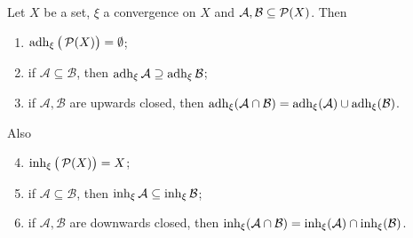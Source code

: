 \begin{proposition}
Let $X$ be a set, $\xi$ a convergence on $X$ and $\mathcal{A},\mathcal{B} \subseteq \operatorname{\mathcal{P}}(X)$. Then
\begin{enumerate}
\item $\operatorname{adh}_\xi \big(\operatorname{\mathcal{P}}(X)\big) = \emptyset$;
\item if $\mathcal{A} \subseteq \mathcal{B}$, then $\operatorname{adh}_\xi \mathcal{A} \supseteq \operatorname{adh}_\xi \mathcal{B}$;
\item if $\mathcal{A},\mathcal{B}$ are upwards closed, then $\operatorname{adh}_\xi(\mathcal{A}\cap \mathcal{B}) = \operatorname{adh}_\xi(\mathcal{A}) \cup \operatorname{adh}_\xi(\mathcal{B})$.
\end{enumerate}
Also
\begin{enumerate} \setcounter{enumi}{3}
\item $\operatorname{inh}_\xi\big(\operatorname{\mathcal{P}}(X)\big) = X$;
\item if $\mathcal{A} \subseteq \mathcal{B}$, then $\operatorname{inh}_\xi \mathcal{A} \subseteq \operatorname{inh}_\xi \mathcal{B}$;
\item if $\mathcal{A},\mathcal{B}$ are downwards closed, then $\operatorname{inh}_\xi(\mathcal{A}\cap \mathcal{B}) = \operatorname{inh}_\xi(\mathcal{A}) \cap \operatorname{inh}_\xi(\mathcal{B})$.
\end{enumerate}
\end{proposition}
